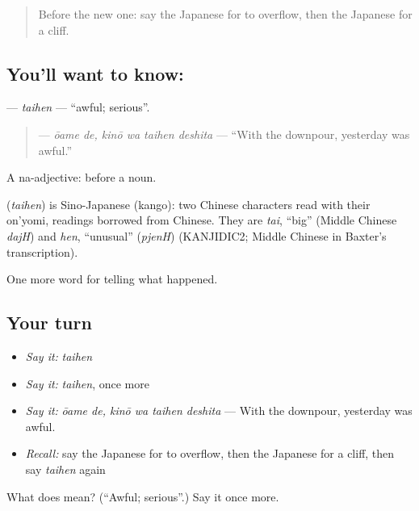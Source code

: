 \label{lesson:JA-C276-taihen}



\begin{quote}
Before the new one: say the Japanese for to overflow, then the Japanese for a cliff.
\end{quote}

\subsection*{You'll want to know: }
\textbf{} — \emph{taihen} — \textquotedblleft{}awful; serious\textquotedblright{}.

\begin{quote}
\textbf{ } — \emph{ōame de, kinō wa taihen deshita} — \textquotedblleft{}With the downpour, yesterday was awful.\textquotedblright{}
\end{quote}

A na-adjective:  before a noun.

\begin{cousinweb}
\textbf{} (\emph{taihen}) is Sino-Japanese (kango): two Chinese characters read with their on'yomi, readings borrowed from Chinese. They are \emph{tai}, \textquotedblleft{}big\textquotedblright{} (Middle Chinese \emph{dajH}) and \emph{hen}, \textquotedblleft{}unusual\textquotedblright{} (\emph{pjenH}) (KANJIDIC2; Middle Chinese in Baxter's transcription).
\end{cousinweb}

\begin{grammarlens}[title={What you've built}]
One more word for telling what happened.
\end{grammarlens}

\subsection*{Your turn}
\begin{itemize}
\raggedright
  \item \emph{Say it:} \emph{taihen}
  \item \emph{Say it:} \emph{taihen}, once more
  \item \emph{Say it:} \emph{ōame de, kinō wa taihen deshita} — With the downpour, yesterday was awful.
  \item \emph{Recall:} say the Japanese for to overflow, then the Japanese for a cliff, then say \emph{taihen} again
\end{itemize}

\begin{tcolorbox}[breakable,colback=teal!4,colframe=teal!35!black,title={Before you move on}]
What does  mean? (\textquotedblleft{}Awful; serious\textquotedblright{}.) Say it once more.
\end{tcolorbox}
